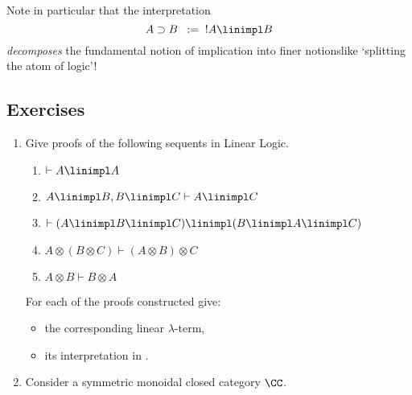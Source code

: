 \documentclass[12pt]{article}
\begin{document}
Note in particular that the interpretation
\[ A \supset B \;\; := \;\; !A \linimpl B \]
\emph{decomposes} the fundamental notion of {implication} into finer notions\HY like `splitting the  atom of logic'!

\subsection{Exercises}
\begin{enumerate}\renewcommand{\theenumi}{\textbf{\arabic{enumi}}}
  \item Give proofs of the following sequents in Linear Logic.
    \begin{enumerate}
    \item $\vdash A \linimpl A$
    \item $ A \linimpl B , B \linimpl C \vdash A \linimpl C$
    \item $\vdash (A \linimpl B \linimpl C) \linimpl (B \linimpl A \linimpl C)$
    \item $A \otimes (B \otimes C) \vdash (A \otimes B) \otimes C$
    \item $A \otimes B \vdash B \otimes A$
    \end{enumerate}
    For each of the proofs constructed give:
    \begin{itemize}
    \item the corresponding linear $\lambda$-term,
    \item its interpretation in \Rel.
    \end{itemize}
  \item Consider a symmetric monoidal closed category $\CC$.
\end{enumerate}
\end{document}
